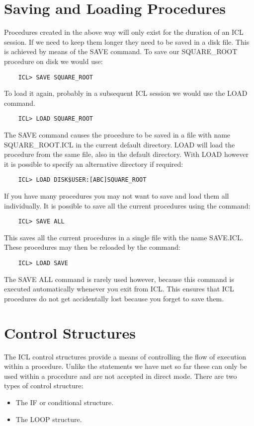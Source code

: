 \section{Saving and Loading Procedures}
Procedures created in the above way will only exist for the duration of
an ICL session. If we need to keep them longer they need to be saved in
a disk file. This is achieved by means of the SAVE command. To save our
SQUARE\_ROOT procedure on disk we would use:
\begin{verbatim}
    ICL> SAVE SQUARE_ROOT
\end{verbatim}
To load it again, probably in a subsequent ICL session we would use
the LOAD command.
\begin{verbatim}
    ICL> LOAD SQUARE_ROOT
\end{verbatim}
The SAVE command causes the procedure to be saved in a file with
name SQUARE\_ROOT.ICL in the current default directory. LOAD will load
the procedure from the same file, also in the default directory. With
LOAD however it is possible to specify an alternative directory if
required:
\begin{verbatim}
    ICL> LOAD DISK$USER:[ABC]SQUARE_ROOT
\end{verbatim}
If you have many procedures you may not want to save and load them all
individually. It is possible to save all the current procedures using
the command:
\begin{verbatim}
    ICL> SAVE ALL
\end{verbatim}
This saves all the current procedures in a single file with the name SAVE.ICL.
These procedures may then be reloaded by the command:
\begin{verbatim}
    ICL> LOAD SAVE
\end{verbatim}
The SAVE ALL command is rarely used however, because this command is
executed automatically whenever you exit from ICL. This ensures that ICL
procedures do not get accidentally lost because you forget to save them.
\section{Control Structures}
The ICL control structures provide a means of controlling the flow of
execution within a procedure. Unlike the statements we have met so far
these can only be used within a procedure and are not accepted in direct mode.
There are two types of control structure:
\begin{itemize}
\item The IF or conditional structure.
\item The LOOP structure.
\end{itemize}
